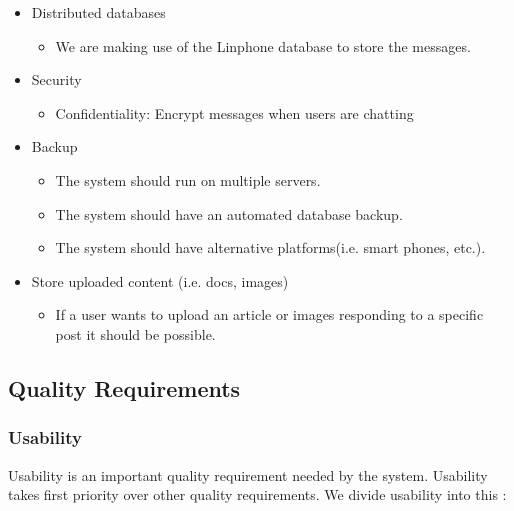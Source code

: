 \documentclass[a4paper]{article}
\begin{document}
\begin{itemize}	
		\item Distributed databases
			\begin{itemize}
				
				\item We are making use of the Linphone database to store the messages.
			\end{itemize}
\end{itemize}

\begin{itemize}	
		\item Security
			\begin{itemize}
				\item Confidentiality: Encrypt messages when users are chatting		
			\end{itemize}
			
		\item Backup
		  \begin{itemize}
			  \item The system should run on multiple servers.
			  \item The system should have an automated database backup.
			  \item The system should have alternative platforms(i.e. smart phones, etc.).
		  \end{itemize}					
		  
		\item Store uploaded content (i.e. docs, images)
		  \begin{itemize}
			  \item If a user wants to upload an article or images responding to a specific post it should be possible.
		  \end{itemize}					
		
\end{itemize}

\subsection{Quality Requirements}
\subsubsection{Usability}
Usability is an important quality requirement needed by the system. Usability takes first priority over other quality requirements. We divide usability into this :\\
\end{document}
